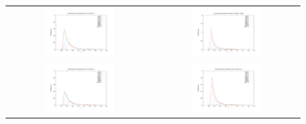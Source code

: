 \begin{figure}[h!]
  \begin{tabular}{cc}
  \includegraphics[width=0.5\textwidth]{variance_ad_free_mesh_t1_v10.pdf} & \includegraphics[width=0.5\textwidth]{variance_ad_free_mesh_t1_fine_v20.pdf}\\
    \includegraphics[width=0.5\textwidth]{variance_ad_free_mesh_t2_v10.pdf} & \includegraphics[width=0.5\textwidth]{variance_ad_free_mesh_t2_v20.pdf}\\

\end{tabular}
\end{figure}
